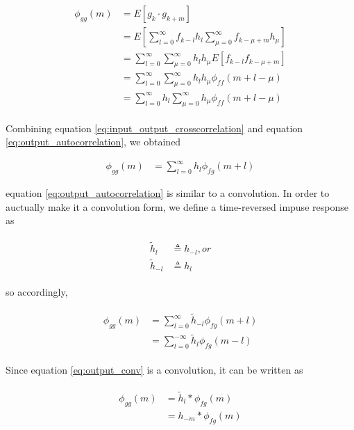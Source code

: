 \documentclass[8pt,a4paper]{article}
\begin{document}
\begin{multicols}{2}
\begin{align}
  \label{eq:output_autocorrelation}
  \begin{split}
    \phi_{gg}(m)&= E \left[ g_{k} \cdot g_{k+m} \right] \\
                &= E \left[  \sum_{l=0}^{\infty} f_{k-l}h_{l} \sum_{\mu=0}^{\infty} f_{k-\mu+m}h_{\mu}  \right] \\
                &= \sum_{l=0}^{\infty} \sum_{\mu=0}^{\infty} h_{l} h_{\mu} E \left[ f_{k-l} f_{k-\mu +m} \right] \\
                &= \sum_{l=0}^{\infty} \sum_{\mu=0}^{\infty} h_{l} h_{\mu} \phi_{ff}(m+l-\mu) \\
                &= \sum_{l=0}^{\infty} h_{l} \sum_{\mu=0}^{\infty} h_{\mu} \phi_{ff}(m+l-\mu)
  \end{split}
\end{align}

Combining equation \ref{eq:input_output_crosscorrelation} and equation \ref{eq:output_autocorrelation}, we obtained

\begin{align}
  \label{eq:output_autocorrelation_2}
  \phi_{gg}(m) &= \sum_{l=0}^{\infty} h_{l} \phi_{fg}(m+l)
\end{align}

equation \ref{eq:output_autocorrelation} is similar to a convolution. In order to auctually make it a convolution form, we define a time-reversed impuse response as

\begin{align}
  \begin{split}
  \tilde{h}_{l} &\triangleq h_{-l}, or \\
  \tilde{h}_{-l} &\triangleq h_{l}
  \end{split}
\end{align}

so accordingly, 

\begin{align}
  \label{eq:output_conv}
  \begin{split}
    \phi_{gg}(m) &= \sum_{l=0}^{\infty} \tilde{h}_{-l} \phi_{fg}(m+l) \\
    &= \sum_{l=0}^{-\infty} \tilde{h}_{l} \phi_{fg}(m-l)
  \end{split}
\end{align}

Since equation \ref{eq:output_conv} is a convolution, it can be written as

\begin{align}
  \label{eq:tilde_output_conv}
  \begin{split}
    \phi_{gg}(m) &= \tilde{h}_{l} * \phi_{fg}(m) \\
    &= h_{-m} * \phi_{fg}(m)
  \end{split}
\end{align}



\end{multicols}
\end{document}
